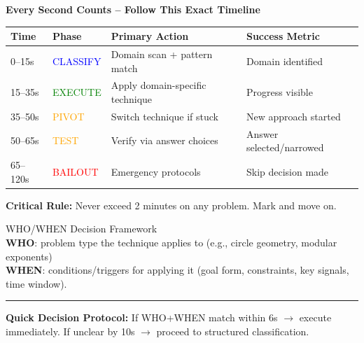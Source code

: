 \documentclass{article}
\begin{document}
\begin{tcolorbox}[colback=yellow!10!white,colframe=orange!75!black,title={\textbf{MASTER TIMELINE: Complete Problem Attack Strategy}}]
\begin{center}
\textbf{Every Second Counts -- Follow This Exact Timeline}
\end{center}
\vspace{2mm}
\begin{tabular}{|l|l|l|l|}
\hline
\textbf{Time} & \textbf{Phase} & \textbf{Primary Action} & \textbf{Success Metric} \\
\hline
0--15s & \textcolor{blue}{CLASSIFY} & Domain scan + pattern match & Domain identified \\
15--35s & \textcolor{green}{EXECUTE} & Apply domain-specific technique & Progress visible \\
35--50s & \textcolor{orange}{PIVOT} & Switch technique if stuck & New approach started \\
50--65s & \textcolor{orange}{TEST} & Verify via answer choices & Answer selected/narrowed \\
65--120s & \textcolor{red}{BAILOUT} & Emergency protocols & Skip decision made \\
\hline
\end{tabular}
\vspace{2mm}
\textbf{Critical Rule:} Never exceed 2 minutes on any problem. Mark and move on.
\end{tcolorbox}

\begin{quickstartbox}{WHO/WHEN Decision Framework}
{\footnotesize\textcolor{timegreen}{}}\\
\textbf{WHO}: problem type the technique applies to (e.g., circle geometry, modular exponents)\\
\textbf{WHEN}: conditions/triggers for applying it (goal form, constraints, key signals, time window).\\
\hrule\vspace{2mm}
\textbf{Quick Decision Protocol:} If WHO+WHEN match within 6s $\rightarrow$ execute immediately. If unclear by 10s $\rightarrow$ proceed to structured classification.
\end{quickstartbox}
\end{document}
